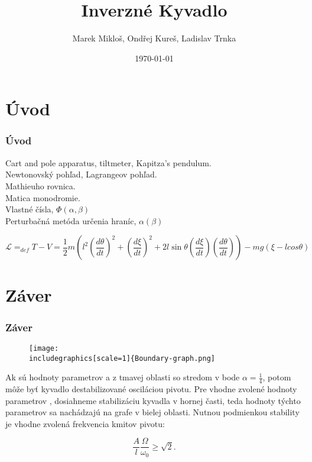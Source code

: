 \documentclass{beamer}
\title[Mechanika]{Inverzné Kyvadlo}
\author[Skupina Z] {Marek Mikloš, Ondřej Kureš, Ladislav Trnka \\ }
\institute[Charles University]{Charles University, Czech Republic}
\date{\today}
\begin{document}

\section*{Úvod}
\label{sec: Int}


\begin{frame}
 
 \frametitle{Úvod}
 \begin{center}
 Cart and pole apparatus, tiltmeter, Kapitza's pendulum.\\    
 Newtonovský pohľad, Lagrangeov pohľad.\\
 Mathieuho rovnica.\\
 Matica monodromie.\\
 Vlastné čísla, $\Phi(\alpha,\beta)$ \\
 Perturbačná metóda určenia hraníc, $\alpha(\beta)$ \\
 \end{center}

 \begin{equation*}
\mathcal{L}=_{def}T-V=\frac{1}{2}m(l^2(\frac{d\theta}{dt})^2+(\frac{d\xi}{dt})^2+2l\sin\theta(\frac{d\xi}{dt})(\frac{d\theta}{dt}))-mg(\xi-lcos{\theta})
 \end{equation*}


 
\end{frame}
 

\section*{Záver}
\label{sec:Záver}

\begin{frame}
  \frametitle{Záver}


 \begin{figure}
 \centerline{\texttt{[image: \\includegraphics[scale=1]\{Boundary-graph.png]} }
 \end{figure}
 Ak sú hodnoty parametrov \alpha a \beta z tmavej oblasti so stredom v bode $\alpha=\frac{1}{4}$, potom môže byť kyvadlo destabilizované osciláciou pivotu.
 Pre vhodne zvolené hodnoty parametrov \alpha, \beta dosiahneme stabilizáciu kyvadla v hornej časti, teda hodnoty týchto parametrov sa nachádzajú na grafe v bielej oblasti. Nutnou podmienkou stability je vhodne zvolená frekvencia kmitov pivotu:
 
 \begin{equation*}
 \frac{A}{l}\frac{\Omega}{\omega_0}\geq \sqrt{2}.
 \end{equation*}  
 

\end{frame}
\end{document}
